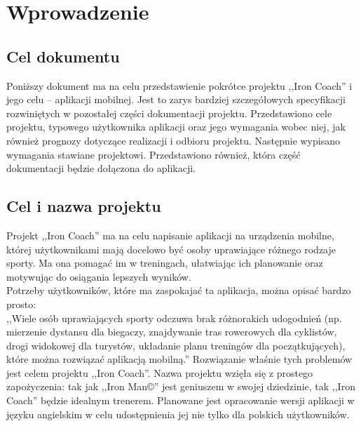 

\tableofcontents
\clearpage
\section{Wprowadzenie}
\subsection{Cel dokumentu}
\noindent Poniższy dokument ma na celu przedstawienie pokrótce projektu ,,Iron Coach'' i jego celu -- aplikacji mobilnej. Jest to zarys bardziej szczegółowych specyfikacji rozwiniętych w pozostałej części dokumentacji projektu. Przedstawiono cele projektu, typowego użytkownika aplikacji oraz jego wymagania wobec niej, jak również prognozy dotyczące realizacji i odbioru projektu. Następnie wypisano wymagania stawiane projektowi. Przedstawiono również, która część dokumentacji będzie dołączona do aplikacji.
\subsection{Cel i nazwa projektu}
\noindent Projekt ,,Iron Coach'' ma na celu napisanie aplikacji na urządzenia mobilne, której użytkownikami mają docelowo być osoby uprawiające różnego rodzaje sporty. Ma ona pomagać im w treningach, ułatwiając ich planowanie oraz motywując do osiągania lepszych wyników. \\
Potrzeby użytkowników, które ma zaspokajać ta aplikacja, można opisać bardzo prosto:\\ 
\indent ,,Wiele osób uprawiających sporty odczuwa brak różnorakich udogodnień (np. mierzenie dystansu dla biegaczy, znajdywanie tras rowerowych dla cyklistów, drogi widokowej dla turystów, układanie planu treningów dla początkujących), które można rozwiązać aplikacją mobilną.''\cite{Ba}
Rozwiązanie właśnie tych problemów jest celem projektu ,,Iron Coach''. 
Nazwa projektu wzięła się z prostego zapożyczenia: tak jak ,,Iron Man©'' jest geniuszem w swojej dziedzinie\cite{Ir}, tak ,,Iron Coach'' będzie idealnym trenerem. Planowane jest opracowanie wersji aplikacji w języku angielskim w celu udostępnienia jej nie tylko dla polskich użytkowników.
